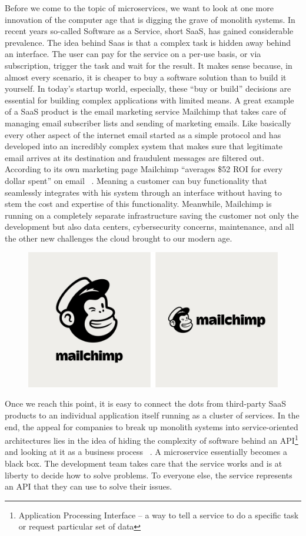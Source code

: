 Before we come to the topic of microservices, we want to look at one more innovation of the computer age that is digging the grave of monolith systems. In recent years so-called Software as a Service, short SaaS, has gained considerable prevalence. The idea behind Saas is that a complex task is hidden away behind an interface. The user can pay for the service on a per-use basis, or via subscription, trigger the task and wait for the result. It makes sense because, in almost every scenario, it is cheaper to buy a software solution than to build it yourself. In today's startup world, especially, these ``buy or build'' decisions are essential for building complex applications with limited means. A great example of a SaaS product is the email marketing service Mailchimp that takes care of managing email subscriber lists and sending of marketing emails. Like basically every other aspect of the internet email started as a simple protocol and has developed into an incredibly complex system that makes sure that legitimate email arrives at its destination and fraudulent messages are filtered out. According to its own marketing page Mailchimp ``averages \$52 ROI for every dollar spent'' on email ~\cite{mailchimp.2020}. Meaning a customer can buy functionality that seamlessly integrates with his system through an interface without having to stem the cost and expertise of this functionality. Meanwhile, Mailchimp is running on a completely separate infrastructure saving the customer not only the development but also data centers, cybersecurity concerns, maintenance, and all the other new challenges the cloud brought to our modern age.

\begin{figure}[ht]
  \centering
  \includegraphics[width=0.8\linewidth]{assets/mailchimp-brand.png}
\end{figure}

Once we reach this point, it is easy to connect the dots from third-party SaaS products to an individual application itself running as a cluster of services. In the end, the appeal for companies to break up monolith systems into service-oriented architectures lies in the idea of hiding the complexity of software behind an API\footnote{Application Processing Interface – a way to tell a service to do a specific task or request particular set of data} and looking at it as a business process ~\cite[p.~359]{melzer.2010}. A microservice essentially becomes a black box. The development team takes care that the service works and is at liberty to decide how to solve problems. To everyone else, the service represents an API that they can use to solve their issues.



